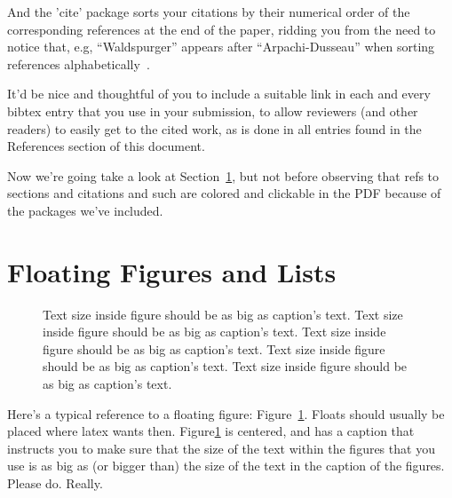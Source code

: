And the 'cite' package sorts your citations by their numerical order
of the corresponding references at the end of the paper, ridding you
from the need to notice that, e.g, ``Waldspurger'' appears after
``Arpachi-Dusseau'' when sorting references
alphabetically~\cite{waldspurger02,arpachiDusseau18:osbook}. 

It'd be nice and thoughtful of you to include a suitable link in each
and every bibtex entry that you use in your submission, to allow
reviewers (and other readers) to easily get to the cited work, as is
done in all entries found in the References section of this document.

Now we're going take a look at Section~\ref{sec:figs}, but not before
observing that refs to sections and citations and such are colored and
clickable in the PDF because of the packages we've included.

\section{Floating Figures and Lists}
\label{sec:figs}


\begin{figure}
\begin{center}
\end{center}
\caption{\label{fig:vectors} Text size inside figure should be as big as
  caption's text. Text size inside figure should be as big as
  caption's text. Text size inside figure should be as big as
  caption's text. Text size inside figure should be as big as
  caption's text. Text size inside figure should be as big as
  caption's text. }
\end{figure}


Here's a typical reference to a floating figure:
Figure~\ref{fig:vectors}. Floats should usually be placed where latex
wants then. Figure\ref{fig:vectors} is centered, and has a caption
that instructs you to make sure that the size of the text within the
figures that you use is as big as (or bigger than) the size of the
text in the caption of the figures. Please do. Really.


